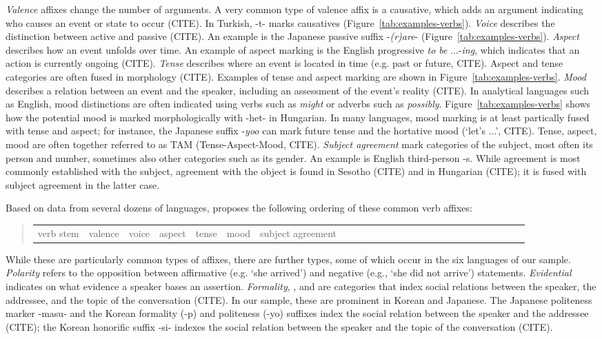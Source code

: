 \documentclass[11pt,letterpaper]{article}
\begin{document}
\textit{Valence} affixes change the number of arguments. A very common type of valence affix is a causative, which adds an argument indicating who causes an event or state to occur (CITE).
In Turkish, -t- marks causatives (Figure~\ref{tab:examples-verbs}).
\textit{Voice} describes the distinction between active and passive (CITE). An example is the Japanese passive suffix -\textit{(r)are}- (Figure~\ref{tab:examples-verbs}).
\textit{Aspect} describes how an event unfolds over time.
An example of aspect marking is the English progressive \textit{to be} ...-\textit{ing}, which indicates that an action is currently ongoing (CITE).
\textit{Tense} describes where an event is located in time (e.g. past or future, CITE).
Aspect and tense categories are often fused in morphology (CITE).
Examples of tense and aspect marking are shown in Figure~\ref{tab:examples-verbs}.
\textit{Mood} describes a relation between an event and the speaker, including an assessment of the event's reality (CITE).
In analytical languages such as English, mood distinctions are often indicated using verbs such as \textit{might} or adverbs such as \textit{possibly}.
Figure~\ref{tab:examples-verbs} shows how the potential mood is marked morphologically with -het- in Hungarian.
In many languages, mood marking is at least partically fused with tense and aspect; for instance, the Japanese suffix -\textit{yoo} can mark future tense and the hortative mood (`let's ...', CITE).
Tense, aspect, mood are often together referred to as TAM (Tense-Aspect-Mood, CITE).
\textit{Subject agreement} mark categories of the subject, most often its person and number, sometimes also other categories such as its gender.
An example is English third-person -s.
While agreement is most commonly established with the subject, agreement with the object is found in Sesotho (CITE) and in Hungarian (CITE); it is fused with subject agreement in the latter case.


Based on data from several dozens of languages, \citep{bybee-morphology-1985} proposes the following ordering of these common verb affixes:
\begin{quote}
\begin{tabular}{llllllllllllllllllllllllll}
verb stem & valence & voice & aspect & tense& mood & subject agreement
\end{tabular}
\end{quote}

While these are particularly common types of affixes, there are further types, some of which occur in the six languages of our sample.
\textit{Polarity} refers to the opposition between affirmative (e.g. `she arrived') and negative  (e.g., `she did not arrive') statements.
\textit{Evidential} indicates on what evidence a speaker bases an assertion.
\textit{Formality}, , and  are categories that index social relations between the speaker, the addressee, and the topic of the conversation (CITE).
In our sample, these are prominent in Korean and Japanese.
The Japanese politeness marker -masu- and the Korean formality (-p) and politeness (-yo) suffixes index the social relation between the speaker and the addressee (CITE); the Korean honorific suffix -si- indexes the social relation between the speaker and the topic of the conversation (CITE).
\end{document}
